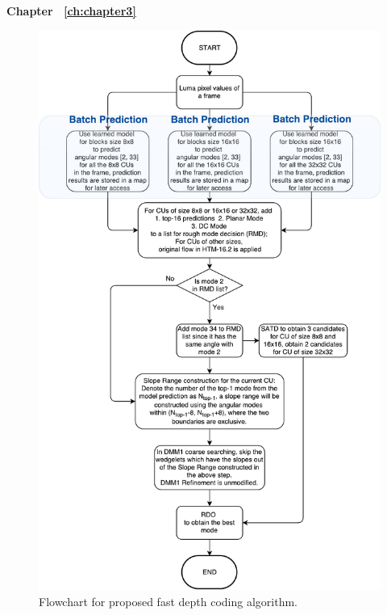 \textbf{Chapter ~\ref{ch:chapter3}}
\begin{figure}
    \centering
    \includegraphics[width=\textwidth,height=\textheight,keepaspectratio]{Figures/proposed-fast-depth-coding-algorithm}
    \caption[Flowchart for proposed fast depth coding algorithm]
    {Flowchart for proposed fast depth coding algorithm.}
    \label{fig:proposed-fast-depth-coding-algorithm}
\end{figure}




